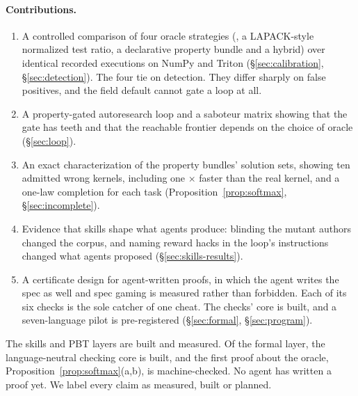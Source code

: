 \paragraph{Contributions.}
\begin{enumerate}
  \item A controlled comparison of four oracle strategies (\allclose, a
    LAPACK-style normalized test ratio, a declarative property bundle and a hybrid)
    over identical recorded executions on NumPy and Triton (\S\ref{sec:calibration},
    \S\ref{sec:detection}). The four tie on detection. They differ sharply on false
    positives, and the field default cannot gate a loop at all.
  \item A property-gated autoresearch loop and a saboteur matrix showing that the gate
    has teeth and that the reachable frontier depends on the choice of oracle
    (\S\ref{sec:loop}).
  \item An exact characterization of the property bundles' solution sets, showing ten
    admitted wrong kernels, including one \fillSpeedup$\times$ faster than the real
    kernel, and a one-law completion for each task (Proposition~\ref{prop:softmax},
    \S\ref{sec:incomplete}).
  \item Evidence that skills shape what agents produce: blinding the mutant authors changed
    the corpus, and naming reward hacks in the loop's instructions changed what agents
    proposed (\S\ref{sec:skills-results}).
  \item A certificate design for agent-written proofs, in which the agent writes the spec
    as well and spec gaming is measured rather than forbidden. Each of its six checks is
    the sole catcher of one cheat. The checks' core is built, and a seven-language pilot is
    pre-registered (\S\ref{sec:formal}, \S\ref{sec:program}).
\end{enumerate}

The skills and PBT layers are built and measured. Of the formal layer, the
language-neutral checking core is built, and the first proof about the oracle, Proposition~\ref{prop:softmax}(a,b),
is machine-checked. No agent has written a proof yet. We
label every claim as measured, built or planned.
